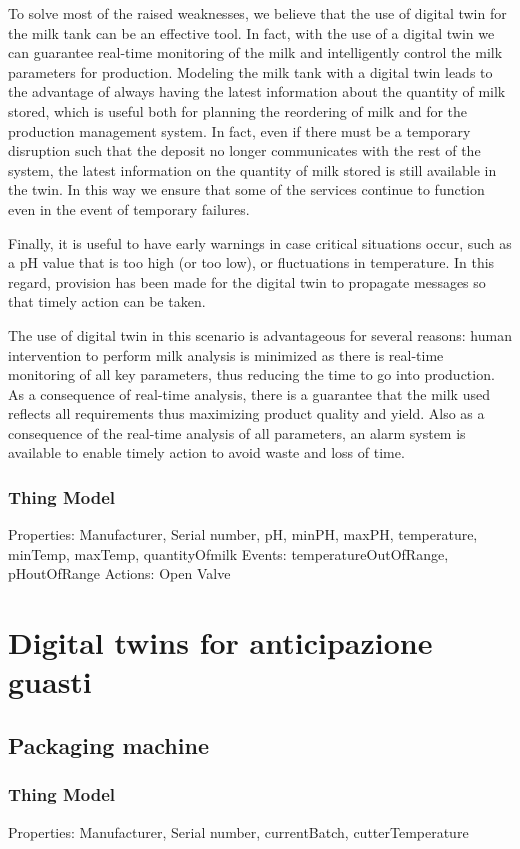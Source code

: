 To solve most of the raised weaknesses, we believe that the use of digital twin for the milk tank can be an effective tool.
In fact, with the use of a digital twin we can guarantee real-time monitoring of the milk and intelligently control the milk parameters for production.
Modeling the milk tank with a digital twin leads to the advantage of always having the latest information about the quantity of milk stored,
which is useful both for planning the reordering of milk and for the production management system.
In fact, even if there must be a temporary disruption such that the deposit no longer communicates with the rest of the system,
the latest information on the quantity of milk stored is still available in the twin.
In this way we ensure that some of the services continue to function even in the event of temporary failures.

Finally, it is useful to have early warnings in case critical situations occur, such as a pH value that is too high (or too low), or fluctuations in temperature.
In this regard, provision has been made for the digital twin to propagate messages so that timely action can be taken.

The use of digital twin in this scenario is advantageous for several reasons: human intervention to perform milk analysis is minimized as there is
real-time monitoring of all key parameters, thus reducing the time to go into production.
As a consequence of real-time analysis, there is a guarantee that the milk used reflects all requirements thus maximizing product quality and yield.
Also as a consequence of the real-time analysis of all parameters, an alarm system is available to enable timely action to avoid waste and loss of time.

\subsubsection{Thing Model}
Properties: Manufacturer, Serial number, pH, minPH, maxPH, temperature, minTemp, maxTemp, quantityOfmilk
Events: temperatureOutOfRange, pHoutOfRange
Actions: Open Valve

\section{Digital twins for anticipazione guasti}
\subsection{Packaging machine}
\subsubsection{Thing Model}
Properties: Manufacturer, Serial number, currentBatch, cutterTemperature

